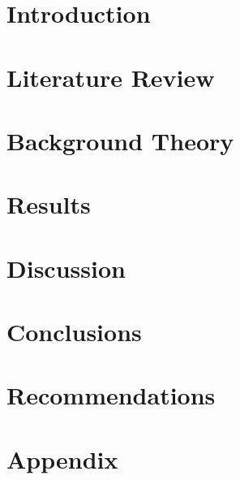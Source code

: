 \documentclass[12pt]{report}
\begin{document}




\newpage

\newpage


\tableofcontents
\listoffigures

\chapter{Introduction}


\chapter{Literature Review}


\chapter{Background Theory}


\chapter{Results}


\chapter{Discussion}


\chapter{Conclusions}


\chapter{Recommendations}


\appendix
\chapter{Appendix}


\printbibliography
\end{document}
